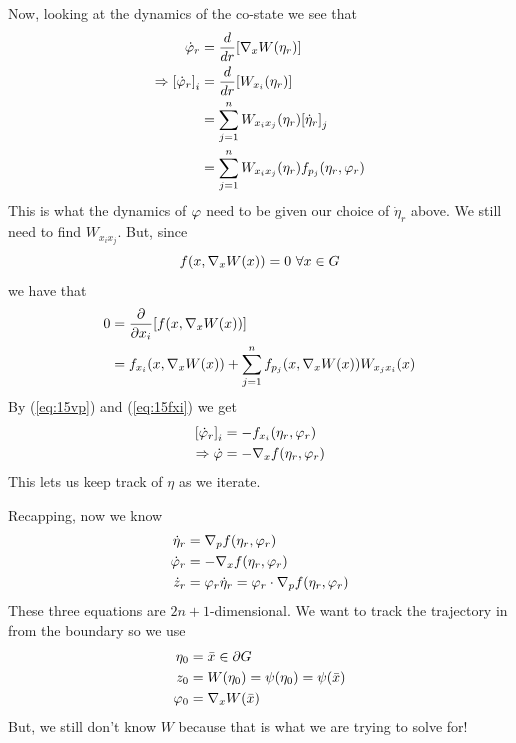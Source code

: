 Now, looking at the dynamics of the co-state we see that
\begin{align}
\label{eq:15vp}
\dot{\varphi}_r &= \frac{d}{dr}[\nabla_xW(\eta_r)] \nonumber \\
\Rightarrow {[\dot{\varphi}_r]}_i &= \frac{d}{dr}[W_{x_i}(\eta_r)] \nonumber \\
&= \sum_{j=1}^n W_{x_i x_j}(\eta_r){[\dot{\eta}_r]}_j \nonumber \\
&= \sum_{j=1}^n W_{x_i x_j}(\eta_r)f_{p_j}(\eta_r,\varphi_r)
\end{align}
This is what the dynamics of $\varphi$ need to be given our choice of $\dot{\eta}_r$ above.
We still need to find $W_{x_i x_j}$.
But, since
$$f(x,\nabla_xW(x)) = 0~\forall x\in G$$
we have that
\begin{align}
\label{eq:15fxi}
0 &= \frac{\partial}{\partial x_i}[f(x,\nw(x))] \nonumber \\%
&= f_{x_i}(x,\nw(x)) + \sum_{j=1}^n f_{p_j}(x,\nw(x))W_{x_j x_i}(x)
\end{align}
By (\ref{eq:15vp}) and (\ref{eq:15fxi}) we get
\begin{align*}
{[\dot{\varphi}_r]}_i &= -f_{x_i}(\eta_r,\varphi_r) \\
\Rightarrow \dot{\varphi} &= -\nabla_x f(\eta_r,\varphi_r)
\end{align*}
This lets us keep track of $\eta$ as we iterate.

Recapping, now we know
\begin{align*}
\dot{\eta}_r &= \nabla_p f(\eta_r,\varphi_r) \\
\dot{\varphi}_r &= -\nabla_x f(\eta_r,\varphi_r) \\
\dot{z}_r &= \varphi_r\dot{\eta}_r = \varphi_r\cdot \nabla_p f(\eta_r,\varphi_r)
\end{align*}
These three equations are $2n+1$-dimensional.
We want to track the trajectory in from the boundary so we use
\begin{align*}
\eta_0 &= \bar{x} \in \partial G \\
z_0 &= W(\eta_0) = \psi(\eta_0) = \psi(\bar{x}) \\
\varphi_0 &= \nabla_xW(\bar{x})
\end{align*}
But, we still don't know $W$ because that is what we are trying to solve for!

